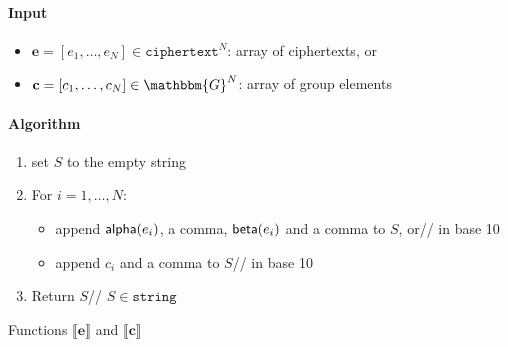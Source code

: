 \documentclass[a4paper]{article}
\newcommand{\G}{\mathbbm{G}}
\newcommand{\jstring}{\texttt{string}}
\begin{document}
\begin{table}
  \begin{framed}
    \noindent\paragraph{Input}
    \begin{itemize}
    \item $\textbf{e}=[e_1,\dots,e_N]\in\texttt{ciphertext}^N$: array
      of ciphertexts, or
    \item $\textbf{c}=[c_1,\dots,c_N]\in\G^N$: array of group elements
    \end{itemize}
    \noindent\paragraph{Algorithm}
    \begin{enumerate}
    \item set $S$ to the empty string
    \item For $i=1,\dots,N$:
      \begin{itemize}
      \item append $\textsf{alpha}(e_i)$, a comma, $\textsf{beta}(e_i)$ and a comma to $S$, or\hfill// in base 10
      \item append $c_i$ and a comma to $S$\hfill// in base 10
      \end{itemize}
    \item Return $S$\hfill// $S\in\jstring$
    \end{enumerate}
  \end{framed}
  \caption{Functions $\llbracket\textbf{e}\rrbracket$ and $\llbracket\textbf{c}\rrbracket$}
  \label{serialize-array}
\end{table}
\end{document}
